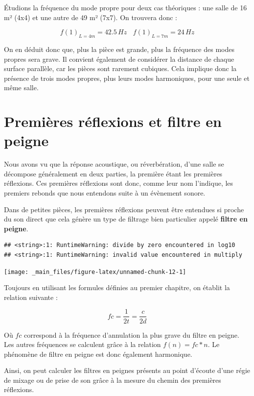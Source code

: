 \documentclass[
]{book}
\begin{document}
Étudions la fréquence du mode propre pour deux cas théoriques : une salle de 16 m² (4x4) et une autre de 49 m² (7x7). On trouvera donc :

\[f(1)_{L=4m} = 42.5 \,Hz \>\>\>\> f(1)_{L=7m} = 24 \,Hz\]

On en déduit donc que, plus la pièce est grande, plus la fréquence des modes propres sera grave. Il convient également de considérer la distance de chaque surface parallèle, car les pièces sont rarement cubiques. Cela implique donc la présence de trois modes propres, plus leurs modes harmoniques, pour une seule et même salle.

\hypertarget{premiuxe8res-ruxe9flexions-et-filtre-en-peigne}{%
\section{Premières réflexions et filtre en peigne}\label{premiuxe8res-ruxe9flexions-et-filtre-en-peigne}}

Nous avons vu que la réponse acoustique, ou réverbération, d'une salle se décompose généralement en deux parties, la première étant les premières réflexions. Ces premières réflexions sont donc, comme leur nom l'indique, les premiers rebonds que nous entendons suite à un évènement sonore.

Dans de petites pièces, les premières réflexions peuvent être entendues si proche du son direct que cela génère un type de filtrage bien particulier appelé \textbf{filtre en peigne}.

\begin{verbatim}
## <string>:1: RuntimeWarning: divide by zero encountered in log10
## <string>:1: RuntimeWarning: invalid value encountered in multiply
\end{verbatim}

\begin{center}\texttt{[image: \_main\_files/figure-latex/unnamed-chunk-12-1]} \end{center}

Toujours en utilisant les formules définies au premier chapitre, on établit la relation suivante :

\[ fc = \frac 1{2t} = \frac c{2d} \]

Où \(fc\) correspond à la fréquence d'annulation la plus grave du filtre en peigne. Les autres fréquences se calculent grâce à la relation \(f(n) = fc*n\). Le phénomène de filtre en peigne est donc également harmonique.

Ainsi, on peut calculer les filtres en peignes présents au point d'écoute d'une régie de mixage ou de prise de son grâce à la mesure du chemin des premières réflexions.
\end{document}
